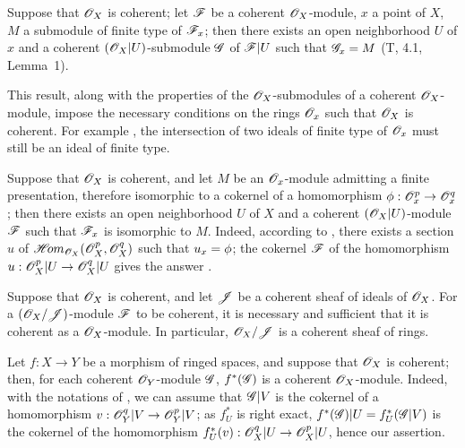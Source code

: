 \begin{env}[5.3.8]
\label{0.5.3.8}
Suppose that $\mathscr{O}_X$ is coherent; let $\mathscr{F}$ be a coherent $\mathscr{O}_X$-module, $x$ a point of
$X$, $M$ a submodule of finite type of $\mathscr{F}_x$; then there exists an open neighborhood $U$
of $x$ and a coherent $(\mathscr{O}_X|U)$-submodule $\mathscr{G}$ of $\mathscr{F}|U$ such that $\mathscr{G}_x=M$
(T, 4.1, Lemma~1).

This result, along with the properties of the $\mathscr{O}_X$-submodules of a coherent
$\mathscr{O}_X$-module, impose the necessary conditions on the rings $\mathscr{O}_x$ such that
$\mathscr{O}_X$ is coherent. For example , the intersection of two
ideals of finite type of $\mathscr{O}_x$ must still be an ideal of finite type.
\end{env}

\begin{env}[5.3.9]
\label{0.5.3.9}
Suppose that $\mathscr{O}_X$ is coherent, and let $M$ be an $\mathscr{O}_x$-module admitting a
finite presentation, therefore isomorphic to a cokernel of a homomorphism
$\phi:\mathscr{O}_x^p\to\mathscr{O}_x^q$; then there exists an open neighborhood $U$ of $X$ and
a coherent $(\mathscr{O}_X|U)$-module $\mathscr{F}$ such that $\mathscr{F}_x$ is isomorphic to
$M$. Indeed, according to , there exists a section $u$ of
$\mathscr{H}\!{om}_{\mathscr{O}_X}(\mathscr{O}_X^p,\mathscr{O}_X^q)$ such that $u_x=\phi$; the cokernel $\mathscr{F}$
of the homomorphism $u:\mathscr{O}_X^p|U\to\mathscr{O}_X^q|U$ gives the answer
.
\end{env}

\begin{env}[5.3.10]
\label{0.5.3.10}
Suppose that $\mathscr{O}_X$ is coherent, and let $\mathscr{J}$ be a coherent sheaf of ideals
of $\mathscr{O}_X$. For a $(\mathscr{O}_X/\mathscr{J})$-module $\mathscr{F}$ to be coherent, it is
necessary and sufficient that it is coherent as a $\mathscr{O}_X$-module. In particular,
$\mathscr{O}_X/\mathscr{J}$ is a coherent sheaf of rings.
\end{env}

\begin{env}[5.3.11]
\label{0.5.3.11}
Let $f:X\to Y$ be a morphism of ringed spaces, and suppose that $\mathscr{O}_X$ is
coherent; then, for each coherent $\mathscr{O}_Y$-module $\mathscr{G}$, $f^*(\mathscr{G})$ is a
coherent $\mathscr{O}_X$-module. Indeed, with the notations of , we can
assume that $\mathscr{G}|V$ is the cokernel of a homomorphism
$v:\mathscr{O}_Y^q|V\to\mathscr{O}_Y^p|V$; as $f_U^*$ is right exact,
$f^*(\mathscr{G})|U=f_U^*(\mathscr{G}|V)$ is the cokernel of the homomorphism
$f_U^*(v):\mathscr{O}_X^q|U\to\mathscr{O}_X^p|U$, hence our assertion.
\end{env}


